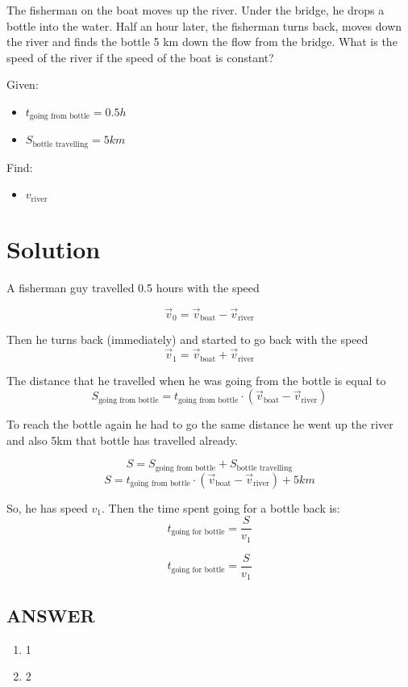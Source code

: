 The fisherman on the boat moves up the river. Under the bridge, he drops a bottle into the water.
Half an hour later, the fisherman turns back, moves down the river and finds the bottle 5 km
down the flow from the bridge. What is the speed of the river if the speed of the boat is constant?

\bigbreak Given: \begin{itemize}
    \item $t_{\text{going from bottle}} = 0.5h$
    \item $S_{\text{bottle travelling}} = 5km$
\end{itemize}

Find: \begin{itemize}
    \item $v_{\text{river}}$
\end{itemize}

\section*{Solution}

A fisherman guy travelled 0.5 hours with the speed

$$\Vec{v}_0 = \Vec{v}_{\text{boat}} - \Vec{v}_{\text{river}}$$

Then he turns back (immediately) and started to go back with the speed
\begin{equation}
    
    \Vec{v}_1 = \Vec{v}_{\text{boat}} + \Vec{v}_{\text{river}}
\end{equation}


The distance that he travelled when he was going from the bottle is equal to
$$S_{\text{going from bottle}} = t_{\text{going from bottle}} \cdot (\Vec{v}_{\text{boat}} - \Vec{v}_{\text{river}})$$

To reach the bottle again he had to go the same distance he went up the river and also 5km that bottle has travelled already.

$$S = S_{\text{going from bottle}} + S_{\text{bottle travelling}}$$
$$S =  t_{\text{going from bottle}} \cdot (\Vec{v}_{\text{boat}} - \Vec{v}_{\text{river}}) + 5km$$

So, he has speed $v_1$. Then the time spent going for a bottle back is:
$$t_{\text{going for bottle}} = \frac{S}{v_1}$$

$$t_{\text{going for bottle}} = \frac{S}{v_1}$$


\vfill
\subsection*{ANSWER}
\begin{enumerate}
    \item 1
    \item 2
\end{enumerate}

